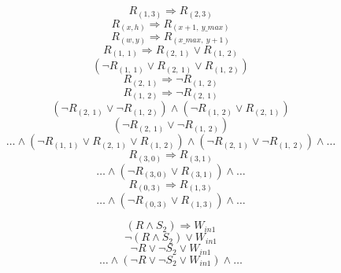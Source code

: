 \documentclass[24pt,a4paper]{article}
\begin{document}
\begin{equation}
	R_{(1, 3)} \Rightarrow R_{(2, 3)}
\end{equation}
\begin{equation}
	R_{(x, h)} \Rightarrow R_{(x + 1,\ y\_max)}
\end{equation}
\begin{equation}
	R_{(w, y)} \Rightarrow R_{(x\_max,\ y + 1)}
\end{equation}
\begin{equation}
R_{(1,\ 1)} \Rightarrow R_{(2,\ 1)} \lor R_{(1,\ 2)}
\end{equation}
\begin{equation}
(\lnot R_{(1,\ 1)} \lor R_{(2,\ 1)} \lor R_{(1,\ 2)})
\end{equation}
\begin{equation}
R_{(2,\ 1)} \Rightarrow \lnot R_{(1,\ 2)}
\end{equation}
\begin{equation}
R_{(1,\ 2)} \Rightarrow \lnot R_{(2,\ 1)}
\end{equation}
\begin{equation}
(\lnot R_{(2,\ 1)} \lor \lnot R_{(1,\ 2)}) \land (\lnot R_{(1,\ 2)} \lor R_{(2,\ 1)})
\end{equation}
\begin{equation}
(\lnot R_{(2,\ 1)} \lor \lnot R_{(1,\ 2)})
\end{equation}
\begin{equation}
\dots \land (\lnot R_{(1,\ 1)} \lor R_{(2,\ 1)} \lor R_{(1,\ 2)}) \land (\lnot R_{(2,\ 1)} \lor \lnot R_{(1,\ 2)}) \land \dots
\end{equation}
\begin{equation}
R_{(3, 0)} \Rightarrow R_{(3, 1)}
\end{equation}
\begin{equation}
\dots \land (\lnot R_{(3, 0)} \lor R_{(3, 1)}) \land \dots
\end{equation}
\begin{equation}
R_{(0, 3)} \Rightarrow R_{(1, 3)}
\end{equation}
\begin{equation}
\dots \land (\lnot R_{(0, 3)} \lor R_{(1, 3)}) \land \dots
\end{equation}


\begin{equation}
(R \land S_2) \Rightarrow W_{in1}
\end{equation}
\begin{equation}
\lnot (R \land S_2) \lor W_{in1}
\end{equation}
\begin{equation}
\lnot R \lor \lnot S_2 \lor W_{in1}
\end{equation}
\begin{equation}
\dots \land (\lnot R \lor \lnot S_2 \lor W_{in1}) \land \dots
\end{equation}
\end{document}
